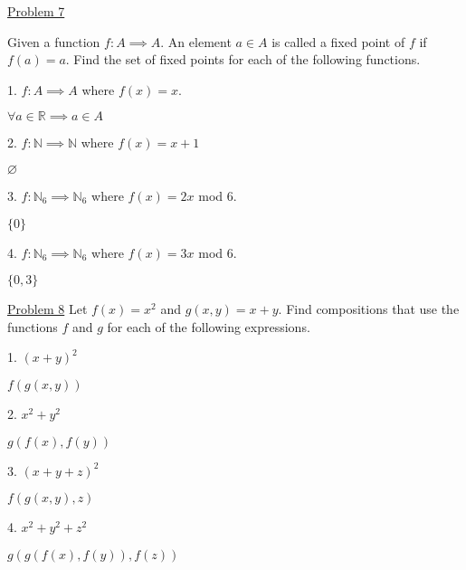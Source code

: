 \documentclass{article}
\begin{document}
\underline{Problem 7}

Given a function $f: A\implies A$. An element $a \in A$ is called a fixed point of $f$ if $f(a)=a$. Find the set of fixed points for each of the following functions.

1. $f: A \implies A$ where $f(x)=x$.

$\forall a \in \mathbb{R} \implies a \in A$\newline

2. $f:\mathbb{N}\implies \mathbb{N}$ where $f(x)=x+1$

$\varnothing$\newline

3. $f:\mathbb{N}_6 \implies \mathbb{N}_6$ where $f(x)=2x$ mod 6.

$\{0\}$\newline

4. $f:\mathbb{N}_6 \implies \mathbb{N}_6$ where $f(x)=3x$ mod 6.

$\{0,3\}$\newline

\underline{Problem 8}
Let $f(x)=x^2$ and $g(x,y)=x+y$. Find compositions that use the functions $f$ and $g$ for each of the following expressions.\newline

1. $(x+y)^2$

$f(g(x,y))$\newline

2. $x^2+y^2$

$g(f(x),f(y))$\newline

3. $(x+y+z)^2$

$f(g(x,y),z)$\newline

4. $x^2 + y^2 + z^2$

$g(g(f(x),f(y)),f(z))$
\end{document}
